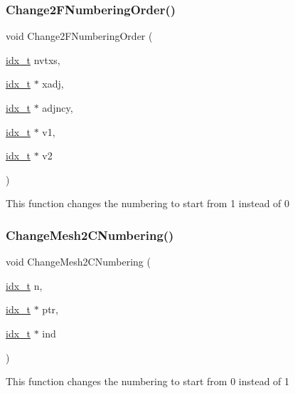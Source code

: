 \subsubsection{\texorpdfstring{Change2\+F\+Numbering\+Order()}{Change2FNumberingOrder()}}
{\footnotesize\ttfamily void Change2\+F\+Numbering\+Order (\begin{DoxyParamCaption}\item[{\hyperlink{a00876_aaa5262be3e700770163401acb0150f52}{idx\+\_\+t}}]{nvtxs,  }\item[{\hyperlink{a00876_aaa5262be3e700770163401acb0150f52}{idx\+\_\+t} $\ast$}]{xadj,  }\item[{\hyperlink{a00876_aaa5262be3e700770163401acb0150f52}{idx\+\_\+t} $\ast$}]{adjncy,  }\item[{\hyperlink{a00876_aaa5262be3e700770163401acb0150f52}{idx\+\_\+t} $\ast$}]{v1,  }\item[{\hyperlink{a00876_aaa5262be3e700770163401acb0150f52}{idx\+\_\+t} $\ast$}]{v2 }\end{DoxyParamCaption})}

This function changes the numbering to start from 1 instead of 0 \mbox{\label{a00945_ac325b86234ebda623e1b8c3f555196d2}} 
\subsubsection{\texorpdfstring{Change\+Mesh2\+C\+Numbering()}{ChangeMesh2CNumbering()}}
{\footnotesize\ttfamily void Change\+Mesh2\+C\+Numbering (\begin{DoxyParamCaption}\item[{\hyperlink{a00876_aaa5262be3e700770163401acb0150f52}{idx\+\_\+t}}]{n,  }\item[{\hyperlink{a00876_aaa5262be3e700770163401acb0150f52}{idx\+\_\+t} $\ast$}]{ptr,  }\item[{\hyperlink{a00876_aaa5262be3e700770163401acb0150f52}{idx\+\_\+t} $\ast$}]{ind }\end{DoxyParamCaption})}

This function changes the numbering to start from 0 instead of 1 \mbox{\label{a00945_a9ce41505b3d76a92b195e3d94c3f09e8}} 
